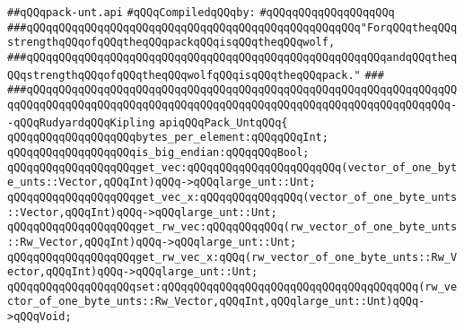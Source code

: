 \label{src/lib/std/src/pack-unt.api}
\verb|##qQQqpack-unt.api|\newline
\newline
\verb|#qQQqCompiledqQQqby:|\newline
\verb|#qQQqqQQqqQQqqQQqqQQq|\newline
\newline
\newline
\newline
\verb|###qQQqqQQqqQQqqQQqqQQqqQQqqQQqqQQqqQQqqQQqqQQqqQQqqQQq"ForqQQqtheqQQqstrengthqQQqofqQQqtheqQQqpackqQQqisqQQqtheqQQqwolf,|\newline
\verb|###qQQqqQQqqQQqqQQqqQQqqQQqqQQqqQQqqQQqqQQqqQQqqQQqqQQqqQQqandqQQqtheqQQqstrengthqQQqofqQQqtheqQQqwolfqQQqisqQQqtheqQQqpack."|\newline
\verb|###|\newline
\verb|###qQQqqQQqqQQqqQQqqQQqqQQqqQQqqQQqqQQqqQQqqQQqqQQqqQQqqQQqqQQqqQQqqQQqqQQqqQQqqQQqqQQqqQQqqQQqqQQqqQQqqQQqqQQqqQQqqQQqqQQqqQQqqQQqqQQqqQQq--qQQqRudyardqQQqKipling|\newline
\newline
\newline
\newline
\verb|apiqQQqPack_UntqQQq{|\newline
\newline
\verb|qQQqqQQqqQQqqQQqqQQqbytes_per_element:qQQqqQQqInt;|\newline
\newline
\verb|qQQqqQQqqQQqqQQqqQQqis_big_endian:qQQqqQQqBool;|\newline
\newline
\verb|qQQqqQQqqQQqqQQqqQQqget_vec:qQQqqQQqqQQqqQQqqQQqqQQq(vector_of_one_byte_unts::Vector,qQQqInt)qQQq->qQQqlarge_unt::Unt;|\newline
\verb|qQQqqQQqqQQqqQQqqQQqget_vec_x:qQQqqQQqqQQqqQQq(vector_of_one_byte_unts::Vector,qQQqInt)qQQq->qQQqlarge_unt::Unt;|\newline
\newline
\verb|qQQqqQQqqQQqqQQqqQQqget_rw_vec:qQQqqQQqqQQq(rw_vector_of_one_byte_unts::Rw_Vector,qQQqInt)qQQq->qQQqlarge_unt::Unt;|\newline
\verb|qQQqqQQqqQQqqQQqqQQqget_rw_vec_x:qQQq(rw_vector_of_one_byte_unts::Rw_Vector,qQQqInt)qQQq->qQQqlarge_unt::Unt;|\newline
\newline
\verb|qQQqqQQqqQQqqQQqqQQqset:qQQqqQQqqQQqqQQqqQQqqQQqqQQqqQQqqQQqqQQq(rw_vector_of_one_byte_unts::Rw_Vector,qQQqInt,qQQqlarge_unt::Unt)qQQq->qQQqVoid;|\newline
